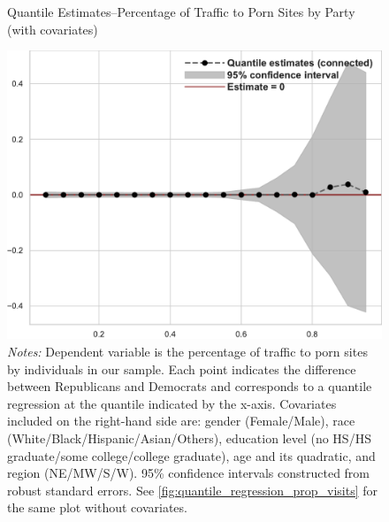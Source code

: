 \documentclass[12pt, letterpaper]{article}
\begin{document}
\begin{figure}
	\centering
	\caption{Quantile Estimates--Percentage of Traffic to Porn Sites by Party (with covariates)}
	\includegraphics[width=.55\linewidth]{../figs/quantile_reg_covariates_proportion_visits_adult.pdf}
	\caption*{\footnotesize \emph{Notes:} 
		Dependent variable is the percentage of traffic to porn sites by individuals in our sample.
		Each point indicates the difference between Republicans and Democrats and corresponds to a quantile regression at the quantile indicated by the x-axis.
		Covariates included on the right-hand side are: gender (Female/Male), race (White/Black/Hispanic/Asian/Others), education level (no HS/HS graduate/some college/college graduate), age and its quadratic, and region (NE/MW/S/W).
		95\% confidence intervals constructed from robust standard errors.
		See \cref{fig:quantile_regression_prop_visits} for the same plot without covariates.
	}
	\label{fig:quantile_regression_prop_visits_covariates}
\end{figure}
\end{document}
